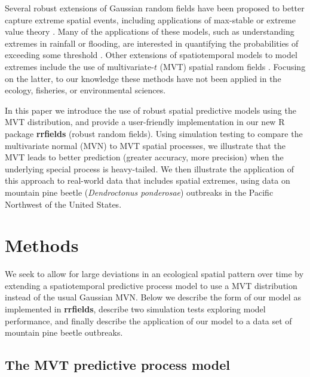 \documentclass[12pt,english]{article}
\begin{document}
\begin{spacing}{1.3}
Several robust extensions of Gaussian random fields have been proposed to
better capture extreme spatial events, including applications of max-stable or
extreme value theory \citep{davison2012, davison2012a}. Many of the
applications of these models, such as understanding extremes in rainfall or
flooding, are interested in quantifying the probabilities of exceeding some
threshold \citep{davis2008}. Other extensions of spatiotemporal models to
model extremes include the use of multivariate-$t$ (MVT) spatial random fields
\citep{roislien2007}. Focusing on the latter, to our knowledge these methods
have not been applied in the ecology, fisheries, or environmental sciences.

In this paper we introduce the use of robust spatial predictive models using
the MVT distribution, and provide a user-friendly implementation in our new
R package \textbf{rrfields} (robust random fields). Using simulation testing
to compare the multivariate normal (MVN) to MVT spatial processes, we
illustrate that the MVT leads to better prediction (greater accuracy, more
precision) when the underlying special process is heavy-tailed. We then
illustrate the application of this approach to real-world data that includes
spatial extremes, using data on mountain pine beetle (\textit{Dendroctonus
  ponderosae}) outbreaks in the Pacific Northwest of the United States.

\section{Methods}

We seek to allow for large deviations in an ecological spatial pattern over
time by extending a spatiotemporal predictive process model to use a MVT
distribution instead of the usual Gaussian MVN. Below we describe the form of
our model as implemented in \textbf{rrfields}, describe two simulation tests
exploring model performance, and finally describe the application of our model
to a data set of mountain pine beetle outbreaks.

\subsection{The MVT predictive process model}


\end{spacing}
\end{document}
